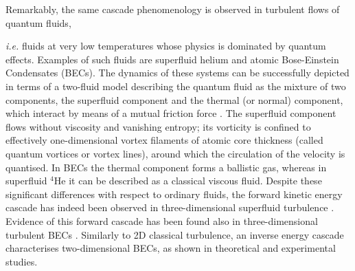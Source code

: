 \documentclass[%
 reprint,
 amsmath,amssymb,
 aps,
 prl,
]{revtex4-2}
\begin{document}
Remarkably, the same cascade phenomenology is observed in turbulent flows 
of quantum fluids, {\textit{i.e.} fluids at very low temperatures whose physics is
dominated by quantum effects.
Examples of such fluids are superfluid helium 
and atomic Bose-Einstein Condensates (BECs). 
The dynamics of these systems can be successfully depicted in terms of 
a two-fluid model \cite{tisza-1938,landau-1949,skrbek-sreenivasan-2012} 
describing the quantum fluid as the mixture of two components, 
the superfluid component and the thermal (or normal) component, which 
interact by means of a mutual friction force 
\cite{jackson-etal-2009,hall-vinen-1956a,hall-vinen-1956b}. 
The superfluid component flows without viscosity and
vanishing entropy; its vorticity is
confined to effectively one-dimensional vortex filaments
of atomic core thickness (called quantum vortices or vortex lines), 
around which the circulation of the velocity is quantised.
In BECs the thermal component forms a ballistic gas,
whereas in superfluid $^4$He it can be described as
a classical viscous fluid.
Despite these significant differences with respect to ordinary fluids, 
the forward kinetic energy cascade has
indeed been observed in three-dimensional superfluid
turbulence 
\cite{maurer1998,salort2010turbulent,baggaley2012,sherwin-robson2015,Muller_KolmogorovKelvinWave_2020,Muller_IntermittencyVelocityCirculation_2021}.
Evidence of this forward cascade has been found also in
three-dimensional turbulent BECs \cite{middleton-spencer2022}. Similarly to 2D classical turbulence, 
an inverse energy cascade characterises two-dimensional BECs, 
as shown in theoretical \cite{bradley2012energy,reeves2013,simula2014emergence,Muller_ExploringEquivalenceTwoDimensional_2024} and experimental \cite{johnstone2019evolution,gauthier2019giant} studies.

}
\end{document}
